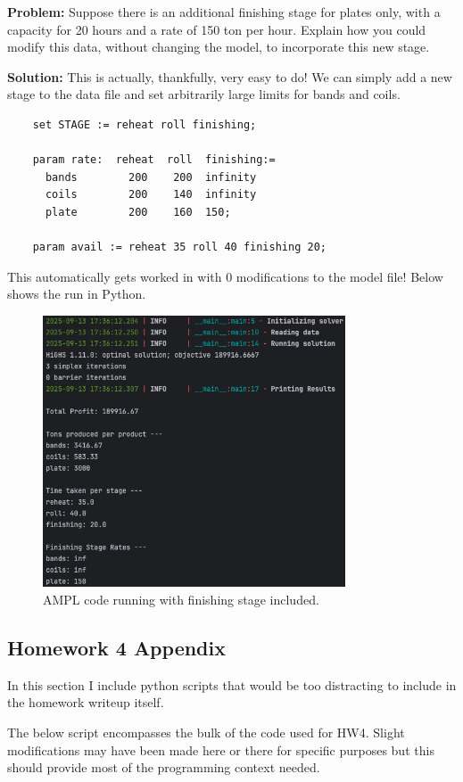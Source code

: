 \textbf{Problem:} Suppose there is an additional finishing stage for plates only, with a capacity for 20 hours and a rate of 150 ton per hour. Explain how you could modify this data, without changing the model, to incorporate this new stage. 

\noindent\textbf{Solution:} This is actually, thankfully, very easy to do! We can simply add a new stage to the data file and set arbitrarily large limits for bands and coils.

\begin{lstlisting}
	set STAGE := reheat roll finishing;

	param rate:  reheat  roll  finishing:=
	  bands        200    200  infinity
	  coils        200    140  infinity
	  plate        200    160  150;

	param avail := reheat 35 roll 40 finishing 20;
\end{lstlisting}

This automatically gets worked in with 0 modifications to the model file! Below shows the run in Python.

\begin{figure}[htbp]
    \centering
    \includegraphics[width=0.8\textwidth]{../images/hw4-part-e-run.png}
    \caption{AMPL code running with finishing stage included.}
    \label{fig:your_label}
\end{figure}

\pagebreak
\subsection*{Homework 4 Appendix}

In this section I include python scripts that would be too distracting to include in the homework writeup itself.

The below script encompasses the bulk of the code used for HW4. Slight modifications may have been made here or there for specific purposes but this should provide most of the programming context needed.

